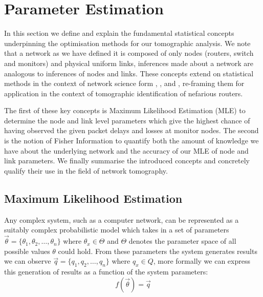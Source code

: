 \section{Parameter Estimation}
\label{sec:Bparameterestimation}

In this section we define and explain the fundamental statistical concepts underpinning the optimisation methods for our tomographic analysis. We note that a network as we have defined it is composed of only nodes (routers, switch and monitors) and physical uniform links, inferences made about a network are analogous to inferences of nodes and links. These concepts extend on statistical methods in the context of network science form \cite{meng_method_2016}, \cite{he_fisher_2015}, and \cite{he_network_2021}, re-framing them for application in the context of tomographic identification of nefarious routers.\par
The first of these key concepts is Maximum Likelihood Estimation (MLE) to determine the node and link level parameters which give the highest chance of having observed the given packet delays and losses at monitor nodes. The second is the notion of Fisher Information to quantify both the amount of knowledge we have about the underlying network and the accuracy of our MLE of node and link parameters. We finally summarise the introduced concepts and concretely qualify their use in the field of network tomography.

\subsection{Maximum Likelihood Estimation}
\label{ssec:Bmle}

Any complex system, such as a computer network, can be represented as a suitably complex probabilistic model which takes in a set of parameters $\vec{\theta} = \{\theta_1, \theta_2,\ldots,\theta_n\}$ where $\theta_x \in \Theta$ and $\Theta$ denotes the parameter space of all possible values $\theta$ could hold. From these parameters the system generates results we can observe $\vec{q} = \{q_1,q_2,\ldots,q_n\}$ where $q_x \in Q$, more formally we can express this generation of results as a function of the system parameters: \[f(\vec{\theta}) = \vec{q}\]

